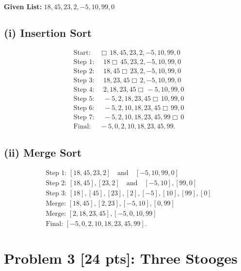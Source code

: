 \documentclass[10pt]{article}
\begin{document}
\textbf{Given List:} \( 18, 45, 23, 2, -5, 10, 99, 0 \)

\subsection*{(i) Insertion Sort}
\[
  \begin{aligned}
    &\text{Start: } \quad \Box \, 18, 45, 23, 2, -5, 10, 99, 0 \\
    &\text{Step 1: } \quad 18 \Box \, 45, 23, 2, -5, 10, 99, 0 \\
    &\text{Step 2: } \quad 18, 45 \Box \, 23, 2, -5, 10, 99, 0 \\
    &\text{Step 3: } \quad 18, 23, 45 \Box \, 2, -5, 10, 99, 0 \\
    &\text{Step 4: } \quad 2, 18, 23, 45 \Box \, -5, 10, 99, 0 \\
    &\text{Step 5: } \quad -5, 2, 18, 23, 45 \Box \, 10, 99, 0 \\
    &\text{Step 6: } \quad -5, 2, 10, 18, 23, 45 \Box \, 99, 0 \\
    &\text{Step 7: } \quad -5, 2, 10, 18, 23, 45, 99 \Box \, 0 \\
    &\text{Final: } \quad -5, 0, 2, 10, 18, 23, 45, 99.
  \end{aligned}
\]

\subsection*{(ii) Merge Sort}
\[
  \begin{aligned}
    &\text{Step 1: } [18, 45, 23, 2] \quad \text{and} \quad [-5, 10, 99, 0] \\
    &\text{Step 2: } [18, 45], [23, 2] \quad \text{and} \quad [-5, 10], [99, 0] \\
    &\text{Step 3: } [18], [45], [23], [2], [-5], [10], [99], [0] \\
    &\text{Merge: } [18, 45], [2, 23], [-5, 10], [0, 99] \\
    &\text{Merge: } [2, 18, 23, 45], [-5, 0, 10, 99] \\
    &\text{Final: } [-5, 0, 2, 10, 18, 23, 45, 99].
  \end{aligned}
\]

\newpage

\section*{Problem 3 [24 pts]: Three Stooges}
\end{document}
